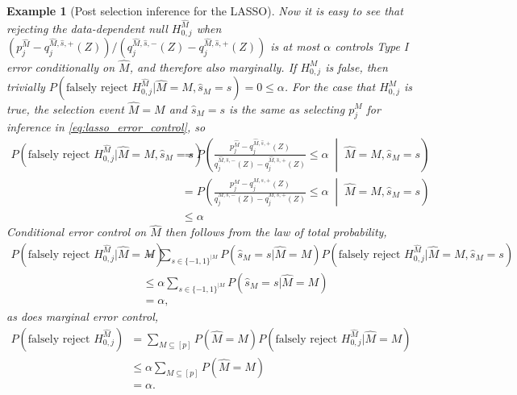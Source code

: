 \documentclass{article}
\newtheorem{example}{Example}
\begin{document}
\begin{appendix}
\begin{example}[Post selection inference for the LASSO]
    Now it is easy to see that rejecting the data-dependent null  $H_{0, j}^{\hat{M}}$ when $ (p^{\hat{M}}_j - q_j^{\hat{M}, \hat{s}, +}(Z))/(q_j^{\hat{M}, \hat{s}, -}(Z) - q_j^{\hat{M}, \hat{s}, +}(Z))$ is at most $\alpha$ controls Type I error conditionally on $\hat{M}$, and therefore also marginally. If $H_{0, j}^{M}$ is false, then trivially $P(\text{falsely reject } H_{0, j}^{\hat{M}} | \hat{M} = M, \hat{s}_M = s) = 0 \leq \alpha $. For the case that $H_{0, j}^M$ is true, the selection event $ \hat{M} = M$ and $\hat{s}_M = s$ is the same as selecting $p^M_j$ for inference in \eqref{eq:lasso_error_control}, so 
    \begin{align*}
        P(\text{falsely reject } H_{0, j}^{\hat{M}}| \hat{M} = M, \hat{s}_M = s) &= P \left( \frac{p^{\hat{M}}_j - q_j^{\hat{M}, \hat{s}, +}(Z)}{q_j^{\hat{M}, \hat{s}, -}(Z) - q_j^{\hat{M}, \hat{s}, +}(Z)} \leq \alpha \;\middle|\; \hat{M} = M, \hat{s}_M = s \right)\\
        &=P \left( \frac{p^{M}_j - q_j^{M, s, +}(Z)}{q_j^{M, s, -}(Z) - q_j^{M, s, +}(Z)} \leq \alpha \;\middle|\; \hat{M} = M, \hat{s}_M = s \right)\\
        &\leq \alpha 
    \end{align*}
    Conditional error control on $\hat{M}$ then follows from the law of total probability,
    \begin{align*}
        P(\text{falsely reject } H_{0, j}^{\hat{M}} | \hat{M} = M) &= \sum_{s \in \{-1, 1 \}^{|M}} P(\hat{s}_M = s | \hat{M} = M) P(\text{falsely reject } H_{0, j}^{\hat{M}} | \hat{M} = M, \hat{s}_M = s)\\
                                                                   &\leq \alpha \sum_{s \in \{-1, 1 \}^{|M}} P(\hat{s}_M = s | \hat{M} = M)\\
                                                                   &=\alpha,
    \end{align*}
    as does marginal error control,
    \begin{align*}
        P(\text{falsely reject } H_{0, j}^{\hat{M}}) &= \sum_{M \subseteq [p]} P(\hat{M} = M) P(\text{falsely reject } H_{0, j}^{\hat{M}} | \hat{M} = M)  \\
                                                     &\leq \alpha \sum_{M \subseteq [p]}P(\hat{M} = M)\\
                                                     &= \alpha. 
    \end{align*}
    \end{example}


\end{appendix}
\end{document}

